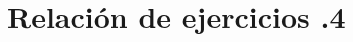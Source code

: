 \newpage
\thispagestyle{empty}

\ 

\vfill
\newpage
\section*{Relación de ejercicios \thechapter.4}

\pagestyle{relaciones}


